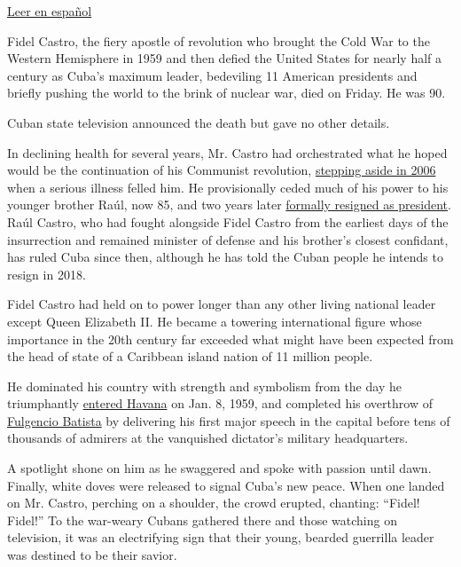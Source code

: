 \href{http://www.nytimes.com/es/2016/11/26/fidel-castro-lider-de-la-revolucion-cubana-y-simbolo-de-la-izquierda-muere-a-los-90-anos/}{Leer
en español}

Fidel Castro, the fiery apostle of revolution who brought the Cold War
to the Western Hemisphere in 1959 and then defied the United States for
nearly half a century as Cuba's maximum leader, bedeviling 11 American
presidents and briefly pushing the world to the brink of nuclear war,
died on Friday. He was 90.

Cuban state television announced the death but gave no other details.

In declining health for several years, Mr. Castro had orchestrated what
he hoped would be the continuation of his Communist revolution,
\href{http://www.nytimes.com/2006/08/14/world/americas/14cuba.html?_r=0}{stepping
aside in 2006} when a serious illness felled him. He provisionally ceded
much of his power to his younger brother Raúl, now 85, and two years
later
\href{http://www.nytimes.com/2008/02/20/world/americas/20cuba.html}{formally
resigned as president}. Raúl Castro, who had fought alongside Fidel
Castro from the earliest days of the insurrection and remained minister
of defense and his brother's closest confidant, has ruled Cuba since
then, although he has told the Cuban people he intends to resign in
2018.

Fidel Castro had held on to power longer than any other living national
leader except Queen Elizabeth II. He became a towering international
figure whose importance in the 20th century far exceeded what might have
been expected from the head of state of a Caribbean island nation of 11
million people.

He dominated his country with strength and symbolism from the day he
triumphantly
\href{http://timesmachine.nytimes.com/timesmachine/1959/01/09/89104354.html?action=click\&contentCollection=Archives\&module=ArticleEndCTA\&region=ArchiveBody\&pgtype=article\&pageNumber=1}{entered
Havana} on Jan. 8, 1959, and completed his overthrow of
\href{http://www.nytimes.com/1973/08/07/archives/batista-excuban-dictator-dies-in-spain-unending-exile-succession-of.html}{Fulgencio
Batista} by delivering his first major speech in the capital before tens
of thousands of admirers at the vanquished dictator's military
headquarters.

A spotlight shone on him as he swaggered and spoke with passion until
dawn. Finally, white doves were released to signal Cuba's new peace.
When one landed on Mr. Castro, perching on a shoulder, the crowd
erupted, chanting: ``Fidel! Fidel!'' To the war-weary Cubans gathered
there and those watching on television, it was an electrifying sign that
their young, bearded guerrilla leader was destined to be their savior.

